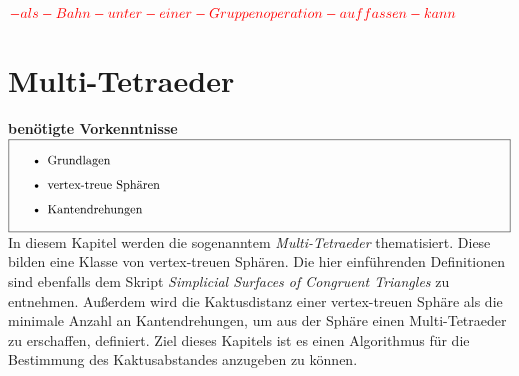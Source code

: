 \documentclass[12pt,titlepage,twoside,cleardoublepage]{article}
\theoremstyle{nummermitklammern}
\numberwithin{equation}{section}
\begin{document}
$\textcolor{red}{-als-Bahn-unter- einer- Gruppenoperation-auffassen- kann}$
\section{Multi-Tetraeder}\label{kapitelmultitetraeder}
\textbf{benötigte Vorkenntnisse} \\
$\fbox{
\parbox{14cm}{\begin{itemize}
\item Grundlagen
\item vertex-treue Sph\"aren
\item Kantendrehungen 
\end{itemize}
}}$\\

In diesem Kapitel werden die sogenanntem \emph{Multi-Tetraeder} thematisiert. Diese bilden eine Klasse von vertex-treuen Sphären. Die hier einführenden Definitionen sind ebenfalls dem Skript \emph{Simplicial Surfaces of Congruent Triangles} zu entnehmen. Außerdem wird die Kaktusdistanz einer vertex-treuen Sphäre als die minimale Anzahl an Kantendrehungen, um aus der Sphäre einen Multi-Tetraeder zu erschaffen, definiert. Ziel dieses Kapitels ist es einen Algorithmus für die Bestimmung des Kaktusabstandes anzugeben zu können. \\\\
\end{document}
